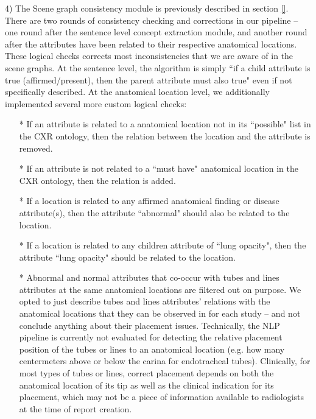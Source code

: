4) The Scene graph consistency module is previously described in section \ref{}. There are two rounds of consistency checking and corrections in our pipeline -- one round after the sentence level concept extraction module, and another round after the attributes have been related to their respective anatomical locations. These logical checks corrects most inconsistencies that we are aware of in the scene graphs. At the sentence level, the algorithm is simply ``if a child attribute is true (affirmed/present), then the parent attribute must also true" even if not specifically described. At the anatomical location level, we additionally implemented several more custom logical checks: 
    \begin{itemize}
        \item[*] If an attribute is related to a anatomical location not in its ``possible" list in the CXR ontology, then the relation between the location and the attribute is removed.
        \item[*] If an attribute is not related to a ``must have" anatomical location in the CXR ontology, then the relation is added.
        \item[*] If a location is related to any affirmed anatomical finding or disease attribute(s), then the attribute ``abnormal" should also be related to the location.
        \item[*] If a location is related to any children attribute of ``lung opacity", then the attribute ``lung opacity" should be related to the location. 
        \item[*] Abnormal and normal attributes that co-occur with tubes and lines attributes at the same anatomical locations are filtered out on purpose. We opted to just describe tubes and lines attributes' relations with the anatomical locations that they can be observed in for each study -- and not conclude anything about their placement issues. Technically, the NLP pipeline is currently not evaluated for detecting the relative placement position of the tubes or lines to an anatomical location (e.g. how many centermeters above or below the carina for endotracheal tubes). Clinically, for most types of tubes or lines, correct placement depends on both the anatomical location of its tip as well as the clinical indication for its placement, which may not be a piece of information available to radiologists at the time of report creation. 
    \end{itemize}

